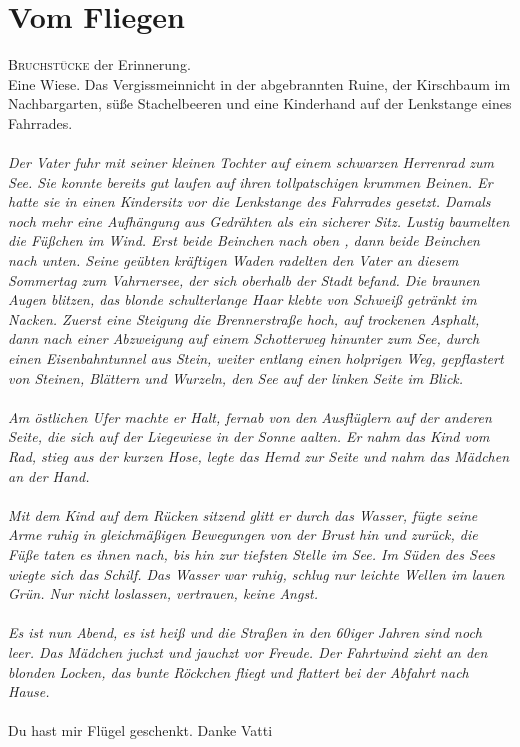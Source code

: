 \chapter{Vom Fliegen}

\lettrine{B}{ruchstücke} der Erinnerung. \\
Eine Wiese. Das Vergissmeinnicht in der abgebrannten Ruine, der Kirschbaum im Nachbargarten, süße Stachelbeeren und eine Kinderhand auf der Lenkstange eines Fahrrades.\\\\ 
\textit{Der Vater fuhr mit seiner kleinen Tochter auf einem schwarzen Herrenrad zum See. Sie konnte bereits  gut laufen auf ihren  tollpatschigen krummen Beinen. Er hatte sie in einen Kindersitz vor die Lenkstange des Fahrrades gesetzt. Damals noch mehr eine Aufhängung aus Gedrähten als ein sicherer Sitz. Lustig baumelten die Füßchen im Wind. Erst beide Beinchen nach oben , dann beide Beinchen nach unten. Seine geübten kräftigen Waden radelten den Vater an diesem Sommertag zum Vahrnersee, der sich oberhalb der Stadt befand. Die braunen Augen blitzen, das blonde schulterlange Haar klebte von Schweiß getränkt im Nacken. Zuerst eine Steigung die Brennerstraße hoch, auf trockenen Asphalt, dann nach einer Abzweigung auf einem Schotterweg hinunter zum See, durch einen Eisenbahntunnel aus Stein, weiter entlang einen holprigen Weg, gepflastert von Steinen, Blättern und Wurzeln, den See auf der linken Seite im Blick. \\\\
Am östlichen Ufer machte er Halt, fernab von den Ausflüglern auf der anderen Seite, die sich auf der Liegewiese in der Sonne aalten. Er nahm das Kind vom Rad, stieg aus der kurzen Hose, legte das Hemd zur Seite und nahm das Mädchen an der Hand. \\\\
Mit dem Kind auf dem Rücken sitzend glitt er durch das Wasser, fügte seine Arme ruhig in gleichmäßigen Bewegungen von der Brust hin und zurück, die Füße taten es ihnen nach, bis hin zur tiefsten Stelle im See. Im Süden des Sees wiegte sich das Schilf. Das Wasser war ruhig, schlug nur leichte Wellen im lauen Grün. Nur nicht loslassen, vertrauen, keine Angst.\\\\
Es ist nun Abend, es ist heiß und die Straßen in den 60iger Jahren sind noch leer. Das Mädchen juchzt und jauchzt vor Freude. Der Fahrtwind zieht an den blonden Locken, das bunte Röckchen fliegt und flattert bei der Abfahrt nach Hause.}\\\\
Du hast mir Flügel geschenkt. Danke Vatti